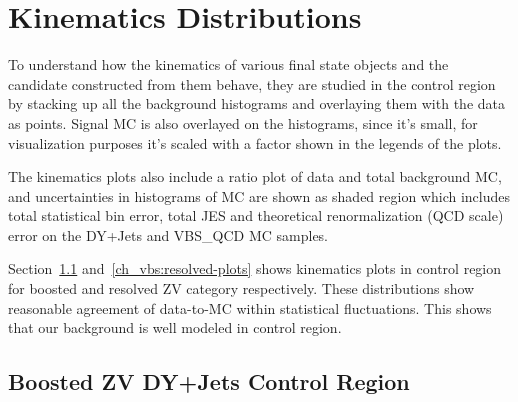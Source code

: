 \clearpage
\section{Kinematics Distributions}

To understand how the kinematics of various final state objects and
the candidate constructed from them behave, they are studied in the control
region by stacking up all the background histograms and
overlaying them with the data as points.
Signal \gls{MC} is also overlayed on the histograms, since it's small,
for visualization purposes it's scaled with a factor shown in
the legends of the plots.

The kinematics plots also include a ratio plot of data and total background
\gls{MC}, and uncertainties in histograms of \gls{MC} are shown as shaded region
which includes total statistical bin error, total \gls{JES} and
theoretical renormalization (QCD scale) error on the DY+Jets and VBS\_QCD \gls{MC} samples.

Section~\ref{ch_vbs:boosted-plots} and~\ref{ch_vbs:resolved-plots}
shows kinematics plots in control region for boosted and
resolved ZV category respectively. These distributions show reasonable
agreement of data-to-\gls{MC} within statistical fluctuations.
This shows that our background is well modeled in control region.

\clearpage{}
\subsection{
  Boosted ZV DY+Jets Control Region
}\label{ch_vbs:boosted-plots}

